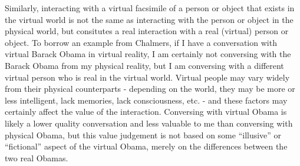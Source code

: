 Similarly, interacting with a virtual facsimile of a person or object that
exists in the virtual world is not the same as interacting with the person or
object in the physical world, but consitutes a real interaction with a real 
(virtual) person or object. To borrow an example from Chalmers, if I have a 
conversation with virtual Barack Obama in virtual reality, I am certainly not
conversing with the Barack Obama from my physical reality, but I am conversing 
with a different virtual person who is real in the virtual world. Virtual people
may vary widely from their physical counterparts - depending on the world, they
may be more or less intelligent, lack memories, lack consciousness, etc. - and
these factors may certainly affect the value of the interaction. Conversing with
virtual Obama is likely a lower quality conversation and less valuable to me
than conversing with physical Obama, but this value judgement is not based on
some ``illusive'' or ``fictional'' aspect of the virtual Obama, merely on the
differences between the two real Obamas.
